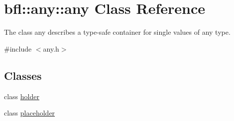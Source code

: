 \hypertarget{classbfl_1_1any_1_1any}{}\section{bfl\+:\+:any\+:\+:any Class Reference}
\label{classbfl_1_1any_1_1any}


The class any describes a type-\/safe container for single values of any type.  




{\ttfamily \#include $<$any.\+h$>$}

\subsection*{Classes}
\begin{DoxyCompactItemize}
\item 
class \mbox{\hyperlink{classbfl_1_1any_1_1any_1_1holder}{holder}}
\item 
class \mbox{\hyperlink{classbfl_1_1any_1_1any_1_1placeholder}{placeholder}}
\end{DoxyCompactItemize}
